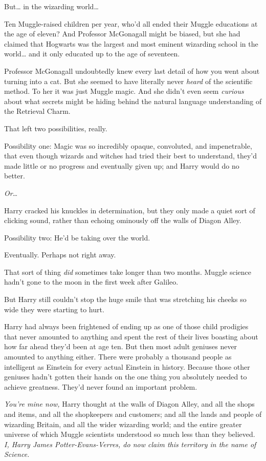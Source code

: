But{\ldots} in the wizarding world{\ldots}

Ten Muggle-raised children per year, who'd all ended their Muggle educations at 
the age of eleven? And Professor McGonagall might be biased, but she had 
claimed that Hogwarts was the largest and most eminent wizarding school in the 
world{\ldots} and it only educated up to the age of seventeen.

Professor McGonagall undoubtedly knew every last detail of how you went about 
turning into a cat. But she seemed to have literally never \emph{heard} of the 
scientific method. To her it was just Muggle magic. And she didn't even seem 
\emph{curious} about what secrets might be hiding behind the natural language 
understanding of the Retrieval Charm.

That left two possibilities, really.

Possibility one: Magic was so incredibly opaque, convoluted, and impenetrable, 
that even though wizards and witches had tried their best to understand, they'd 
made little or no progress and eventually given up; and Harry would do no 
better.

\emph{Or}{\ldots}

Harry cracked his knuckles in determination, but they only made a quiet sort of 
clicking sound, rather than echoing ominously off the walls of Diagon Alley.

Possibility two: He'd be taking over the world.

Eventually. Perhaps not right away.

That sort of thing \emph{did} sometimes take longer than two months. Muggle 
science hadn't gone to the moon in the first week after Galileo.

But Harry still couldn't stop the huge smile that was stretching his cheeks so 
wide they were starting to hurt.

Harry had always been frightened of ending up as one of those child prodigies 
that never amounted to anything and spent the rest of their lives boasting 
about how far ahead they'd been at age ten. But then most adult geniuses never 
amounted to anything either. There were probably a thousand people as 
intelligent as Einstein for every actual Einstein in history. Because those 
other geniuses hadn't gotten their hands on the one thing you absolutely needed 
to achieve greatness. They'd never found an important problem.

\emph{You're mine now,} Harry thought at the walls of Diagon Alley, and all the 
shops and items, and all the shopkeepers and customers; and all the lands and 
people of wizarding Britain, and all the wider wizarding world; and the entire 
greater universe of which Muggle scientists understood so much less than they 
believed. \emph{I, Harry James Potter-Evans-Verres, do now claim this territory 
in the name of Science.}

